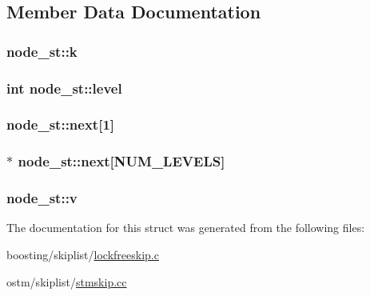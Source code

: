 \subsection{Member Data Documentation}
\hypertarget{structnode__st_a814e8af15def824006272679779bcbed}{
\subsubsection[{k}]{ node\-\_\-st\-::k}}\label{structnode__st_a814e8af15def824006272679779bcbed}
\hypertarget{structnode__st_ab03fdaae977dbc619cc46b851b2ecdbf}{
\subsubsection[{level}]{\setlength{\rightskip}{0pt plus 5cm}int node\-\_\-st\-::level}}\label{structnode__st_ab03fdaae977dbc619cc46b851b2ecdbf}
\hypertarget{structnode__st_a480c5a9d7c572135f47110a05395f459}{
\subsubsection[{next}]{ node\-\_\-st\-::next\mbox{[}1\mbox{]}}}\label{structnode__st_a480c5a9d7c572135f47110a05395f459}
\hypertarget{structnode__st_ace3abf7f9c522a297bc22b60fbf3df9a}{
\subsubsection[{next}]{$\ast$ node\-\_\-st\-::next\mbox{[}N\-U\-M\-\_\-\-L\-E\-V\-E\-L\-S\mbox{]}}}\label{structnode__st_ace3abf7f9c522a297bc22b60fbf3df9a}
\hypertarget{structnode__st_a113aa8f9a42989dce959b388411c6b0f}{
\subsubsection[{v}]{ node\-\_\-st\-::v}}\label{structnode__st_a113aa8f9a42989dce959b388411c6b0f}


The documentation for this struct was generated from the following files\-:\begin{DoxyCompactItemize}
\item 
boosting/skiplist/\hyperlink{lockfreeskip_8c}{lockfreeskip.\-c}\item 
ostm/skiplist/\hyperlink{stmskip_8cc}{stmskip.\-cc}\end{DoxyCompactItemize}
